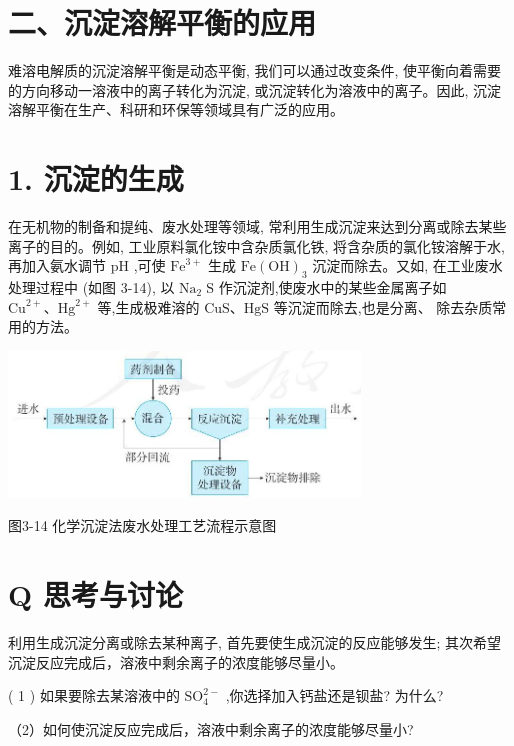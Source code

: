\documentclass[10pt]{article}
\begin{document}
\section*{二、沉淀溶解平衡的应用}

难溶电解质的沉淀溶解平衡是动态平衡, 我们可以通过改变条件, 使平衡向着需要的方向移动一溶液中的离子转化为沉淀, 或沉淀转化为溶液中的离子。因此, 沉淀溶解平衡在生产、科研和环保等领域具有广泛的应用。

\section*{1. 沉淀的生成}

在无机物的制备和提纯、废水处理等领域, 常利用生成沉淀来达到分离或除去某些离子的目的。例如, 工业原料氯化铵中含杂质氯化铁, 将含杂质的氯化铵溶解于水,再加入氨水调节 \(\mathrm{{pH}}\) ,可使 \({\mathrm{{Fe}}}^{3 + }\) 生成 \(\mathrm{{Fe}}{\left( \mathrm{{OH}}\right) }_{3}\) 沉淀而除去。又如, 在工业废水处理过程中 (如图 3-14), 以 \({\mathrm{{Na}}}_{2}\mathrm{\;S}\) 作沉淀剂,使废水中的某些金属离子如 \({\mathrm{{Cu}}}^{2 + }\text{、}{\mathrm{{Hg}}}^{2 + }\) 等,生成极难溶的 \(\mathrm{{CuS}}\text{、}\mathrm{{HgS}}\) 等沉淀而除去,也是分离、 除去杂质常用的方法。

\begin{center}
\includegraphics[max width=0.7\textwidth]{images/0190da9d-8bfd-732f-bc2c-0b21d0f13b91_86_995607.jpg}
\end{center}

图3-14 化学沉淀法废水处理工艺流程示意图

\section*{Q 思考与讨论}

利用生成沉淀分离或除去某种离子, 首先要使生成沉淀的反应能够发生; 其次希望沉淀反应完成后，溶液中剩余离子的浓度能够尽量小。

( 1 ) 如果要除去某溶液中的 \({\mathrm{{SO}}}_{4}^{2 - }\) ,你选择加入钙盐还是钡盐? 为什么?

（2）如何使沉淀反应完成后，溶液中剩余离子的浓度能够尽量小?
\end{document}
